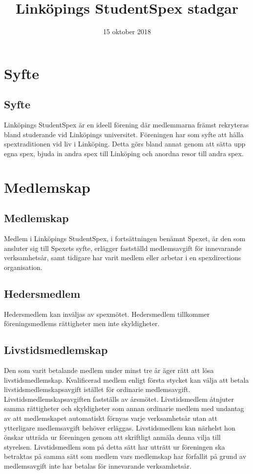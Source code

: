 \documentclass[a4paper]{article}
\title{Linköpings StudentSpex stadgar}
\author{}
\date{15 oktober 2018}
\begin{document}
\maketitle

\section{Syfte}
\subsection{Syfte}
Linköpings StudentSpex är en ideell förening där medlemmarna främst rekryteras bland studerande vid Linköpings universitet. Föreningen har som syfte att hålla spextraditionen vid liv i Linköping. Detta görs bland annat genom att sätta upp egna spex, bjuda in andra spex till Linköping och anordna resor till andra spex.

\section{Medlemskap}
\subsection{Medlemskap}
Medlem i Linköpings StudentSpex, i fortsättningen benämnt Spexet, är den som ansluter sig till Spexets syfte, erlägger fastställd medlemsavgift för innevarande verksamhetsår, samt tidigare har varit medlem eller arbetar i en spexdirections organisation.

\subsection{Hedersmedlem}
Hedersmedlem kan inväljas av spexmötet. Hedersmedlem tillkommer föreningsmedlems rättigheter men inte skyldigheter.

\subsection{Livstidsmedlemskap}
Den som varit betalande medlem under minst tre år äger rätt att lösa livstidsmedlemskap. Kvalificerad medlem enligt första stycket kan välja att betala livstidsmedlemskapsavgift istället för ordinarie medlemsavgift. \newline
\newline
Livstidsmedlemskapsavgiften fastställs av årsmötet.\newline
\newline
Livstidsmedlem åtnjuter samma rättigheter och skyldigheter som annan ordinarie medlem med undantag av att medlemskapet automatiskt förnyas varje verksamhetsår utan att ytterligare medlemsavgift behöver erläggas.\newline
\newline
Livstidsmedlem kan närhelst hon önskar utträda ur föreningen genom att skriftligt anmäla denna vilja till styrelsen. Livstidsmedlem som på detta sätt har utträtt ur föreningen ska betraktas på samma sätt som medlem vars medlemskap har förfallit på grund av medlemsavgift inte har betalas för innevarande verksamhetsår.
\end{document}
